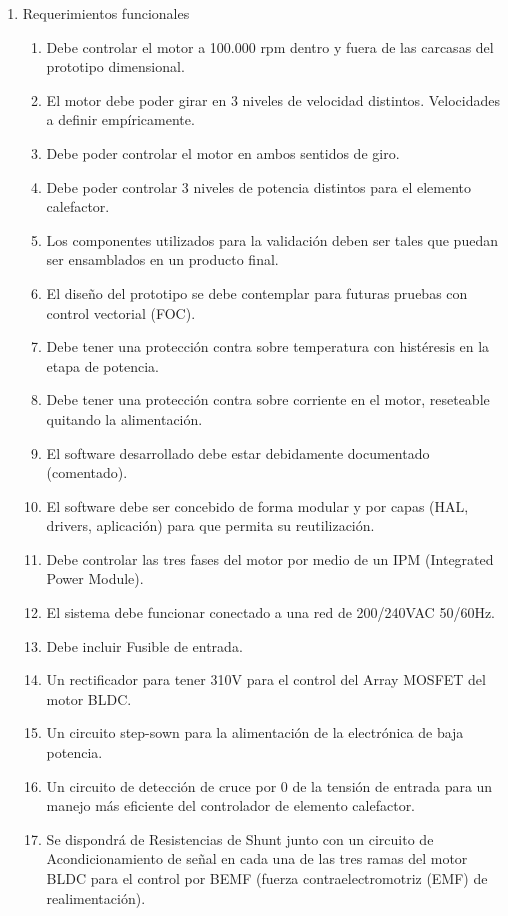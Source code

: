 \documentclass[
11pt, %
codirector, %
]{charter}
\begin{document}
\begin{enumerate}
	\item Requerimientos funcionales
	      \begin{enumerate}
		      \item Debe controlar el motor a 100.000 rpm dentro y fuera de las carcasas del prototipo dimensional.
		      \item El motor debe poder girar en 3 niveles de velocidad distintos. Velocidades a definir empíricamente.
		      \item Debe poder controlar el motor en ambos sentidos de giro.
		      \item Debe poder controlar 3 niveles de potencia distintos para el elemento calefactor.
		      \item Los componentes utilizados para la validación deben ser tales que puedan ser ensamblados en un producto final.
		      \item El diseño del prototipo se debe contemplar para futuras pruebas con control vectorial (FOC).
		      \item Debe tener una protección contra sobre temperatura con histéresis en la etapa de potencia.
		      \item Debe tener una protección contra sobre corriente en el motor, reseteable quitando la alimentación.
		      \item El software desarrollado debe estar debidamente documentado (comentado).
		      \item El software debe ser concebido de forma modular y por capas (HAL, drivers, aplicación) para que permita su reutilización.
		      \item Debe controlar las tres fases del motor por medio de un IPM (Integrated Power Module).
		      \item El sistema debe funcionar conectado a una red de 200/240VAC 50/60Hz.
		      \item Debe incluir Fusible de entrada.
		      \item Un rectificador para tener 310V para el control del Array MOSFET del motor BLDC.
		      \item Un circuito step-sown para la alimentación de la electrónica de baja potencia.
		      \item Un circuito de detección de cruce por 0 de la tensión de entrada para un manejo más eficiente del controlador de elemento calefactor.
		      \item Se dispondrá de Resistencias de Shunt junto con un circuito de Acondicionamiento de señal en cada una de las tres ramas del motor BLDC para el control por BEMF (fuerza contraelectromotriz (EMF) de realimentación).

\end{enumerate}
\end{enumerate}
\end{document}
